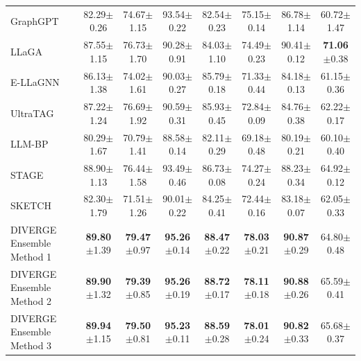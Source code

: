 \documentclass[a4paper,fleqn]{cas-sc}
\DeclareRobustCommand{\revcommon}[2][]{\textcolor{revshared}{#2}} %
\begin{document}
\begin{table}[htbp]
\begin{tabular*}{\textwidth}{@{\extracolsep{\fill}} lccccccc @{}}
GraphGPT     & 82.29{\scriptsize$\pm$0.26} & 74.67{\scriptsize$\pm$1.15} & 93.54{\scriptsize$\pm$0.22} & 82.54{\scriptsize$\pm$0.23} & 75.15{\scriptsize$\pm$0.14} & 86.78{\scriptsize$\pm$1.14} & 60.72{\scriptsize$\pm$1.47} \\
LLaGA        & 87.55{\scriptsize$\pm$1.15} & 76.73{\scriptsize$\pm$1.70} & 90.28{\scriptsize$\pm$0.91} & 84.03{\scriptsize$\pm$1.10} & 74.49{\scriptsize$\pm$0.23} & 90.41{\scriptsize$\pm$0.12} & \textbf{71.06}{\scriptsize$\pm$0.38} \\
\revcommon[R2,R4]{E-LLaGNN}     & 86.13{\scriptsize$\pm$1.38} & 74.02{\scriptsize$\pm$1.61} & 90.03{\scriptsize$\pm$0.27} & 85.79{\scriptsize$\pm$0.18} & 71.33{\scriptsize$\pm$0.44} & 84.18{\scriptsize$\pm$0.13} & 61.15{\scriptsize$\pm$0.36} \\
\revcommon[R2,R4]{UltraTAG}     & 87.22{\scriptsize$\pm$1.24} & 76.69{\scriptsize$\pm$1.92} & 90.59{\scriptsize$\pm$0.31} & 85.93{\scriptsize$\pm$0.45} & 72.84{\scriptsize$\pm$0.09} & 84.76{\scriptsize$\pm$0.38} & 62.22{\scriptsize$\pm$0.17} \\
\revcommon[R2,R4]{LLM-BP}       & 80.29{\scriptsize$\pm$1.67} & 70.79{\scriptsize$\pm$1.41} & 88.58{\scriptsize$\pm$0.14} & 82.11{\scriptsize$\pm$0.29} & 69.18{\scriptsize$\pm$0.48} & 80.19{\scriptsize$\pm$0.21} & 60.10{\scriptsize$\pm$0.40} \\
\revcommon[R2,R4]{STAGE}        & 88.90{\scriptsize$\pm$1.13} & 76.44{\scriptsize$\pm$1.58} & 93.49{\scriptsize$\pm$0.46} & 86.73{\scriptsize$\pm$0.08} & 74.27{\scriptsize$\pm$0.24} & 88.23{\scriptsize$\pm$0.34} & 64.92{\scriptsize$\pm$0.12} \\
\revcommon[R2,R4]{SKETCH}       & 82.30{\scriptsize$\pm$1.79} & 71.51{\scriptsize$\pm$1.26} & 90.01{\scriptsize$\pm$0.22} & 84.25{\scriptsize$\pm$0.41} & 72.44{\scriptsize$\pm$0.16} & 83.18{\scriptsize$\pm$0.07} & 62.05{\scriptsize$\pm$0.33} \\
\midrule

DIVERGE Ensemble Method 1 & \textbf{89.80}{\scriptsize$\pm$1.39} & \textbf{79.47}{\scriptsize$\pm$0.97} & \textbf{95.26}{\scriptsize$\pm$0.14} & \textbf{88.47}{\scriptsize$\pm$0.22} & \textbf{78.03}{\scriptsize$\pm$0.21} & \textbf{90.87}{\scriptsize$\pm$0.29} & 64.80{\scriptsize$\pm$0.48} \\
DIVERGE Ensemble Method 2 & \textbf{89.90}{\scriptsize$\pm$1.32} & \textbf{79.39}{\scriptsize$\pm$0.85} & \textbf{95.26}{\scriptsize$\pm$0.19} & \textbf{88.72}{\scriptsize$\pm$0.17} & \textbf{78.11}{\scriptsize$\pm$0.18} & \textbf{90.88}{\scriptsize$\pm$0.26} & 65.59{\scriptsize$\pm$0.41} \\
DIVERGE Ensemble Method 3 & \textbf{89.94}{\scriptsize$\pm$1.15} & \textbf{79.50}{\scriptsize$\pm$0.81} & \textbf{95.23}{\scriptsize$\pm$0.11} & \textbf{88.59}{\scriptsize$\pm$0.28} & \textbf{78.01}{\scriptsize$\pm$0.24} & \textbf{90.82}{\scriptsize$\pm$0.33} & 65.68{\scriptsize$\pm$0.37} \\
\bottomrule
\end{tabular*}
\end{table}
\end{document}

